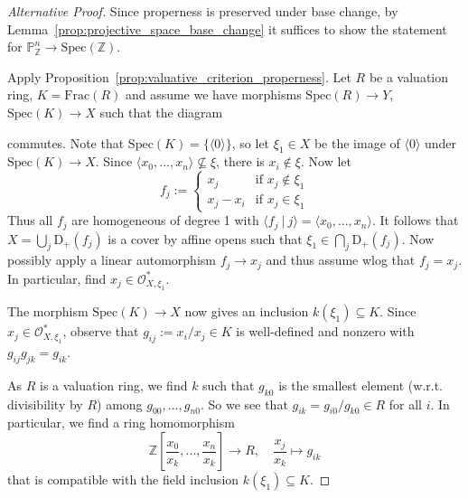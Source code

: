 \documentclass{scrartcl}
\newcommand{\Z}{\mathbb{Z}}
\newcommand{\D}[1]{\mathrm{D}_+(#1)}
\renewcommand{\P}{\mathbb{P}}
\newcommand{\Spec}{\mathrm{Spec}}
\newcommand{\Frac}{\mathrm{Frac}}
\renewcommand{\O}{\mathcal{O}}
\theoremstyle{definition}
\begin{document}
\begin{proof}[Alternative Proof]
    Since properness is preserved under base change, by Lemma~\ref{prop:projective_space_base_change} it suffices to show the statement for $\P_\Z^n \to \Spec(\Z)$.

    Apply Proposition~\ref{prop:valuative_criterion_properness}.
    Let $R$ be a valuation ring, $K = \Frac(R)$ and assume we have morphisms $\Spec(R) \to Y$, $\Spec(K) \to X$ such that the diagram
    \begin{center}
    \end{center}
    commutes.
    Note that $\Spec(K) = \{ \langle 0 \rangle \}$, so let $\xi_1 \in X$ be the image of $\langle 0 \rangle$ under $\Spec(K) \to X$.
    Since $\langle x_0, ..., x_n \rangle \not\subseteq \xi$, there is $x_i \not\in \xi$.
    Now let
    \begin{equation*}
        f_j := \begin{cases}
            x_j & \text{if $x_j \notin \xi_1$} \\
            x_j - x_i & \text{if $x_j \in \xi_1$}
        \end{cases}
    \end{equation*}
    Thus all $f_j$ are homogeneous of degree 1 with $\langle f_j \ | \ j \rangle = \langle x_0, ..., x_n \rangle$.
    It follows that $X = \bigcup_j \D{f_j}$ is a cover by affine opens such that $\xi_1 \in \bigcap_j \D{f_j}$.
    Now possibly apply a linear automorphism $f_j \to x_j$ and thus assume wlog that $f_j = x_j$.
    In particular, find $x_j \in \O_{X, \xi_1}^*$.

    The morphism $\Spec(K) \to X$ now gives an inclusion $k(\xi_1) \subseteq K$.
    Since $x_j \in \O_{X, \xi_1}^*$, observe that $g_{ij} := x_i / x_j \in K$ is well-defined and nonzero with $g_{ij} g_{jk} = g_{ik}$.

    As $R$ is a valuation ring, we find $k$ such that $g_{k0}$ is the smallest element (w.r.t. divisibility by $R$) among $g_{00}, ..., g_{n0}$.
    So we see that $g_{ik} = g_{i0} / g_{k0} \in R$ for all $i$.
    In particular, we find a ring homomorphism
    \begin{equation*}
        \Z\left[ \frac {x_0} {x_k}, ..., \frac {x_n} {x_k} \right] \to R, \quad \frac {x_j} {x_k} \mapsto g_{ik}
    \end{equation*}
    that is compatible with the field inclusion $k(\xi_1) \subseteq K$.


\end{proof}
\end{document}
